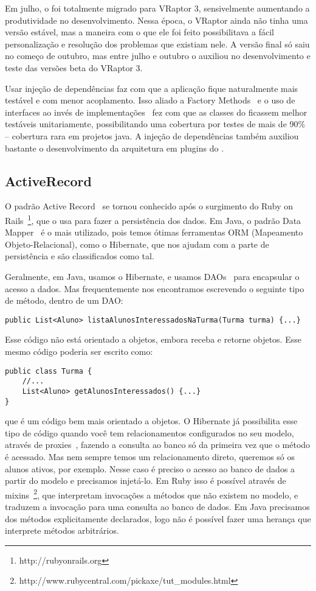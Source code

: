 Em julho, o \calopsita foi totalmente migrado para VRaptor 3, sensivelmente aumentando a produtividade no desenvolvimento. Nessa época, o VRaptor ainda não tinha uma versão estável, mas a maneira com o que ele foi feito possibilitava a fácil personalização e resolução dos problemas que existiam nele. A versão final só saiu no começo de outubro, mas entre julho e outubro o \calopsita auxiliou no desenvolvimento e teste das versões beta do VRaptor 3.

Usar injeção de dependências faz com que a aplicação fique naturalmente mais testável e com menor acoplamento. Isso aliado a Factory Methods~\cite{gof} e o uso de interfaces ao invés de implementações~\cite{effective} fez com que as classes do \calopsita ficassem melhor testáveis unitariamente, possibilitando uma cobertura por testes de mais de 90\% -- cobertura rara em projetos java. A injeção de dependências também auxiliou bastante o desenvolvimento da arquitetura em plugins do \calopsita.

\subsection{ActiveRecord}

O padrão Active Record~\cite{fowler} se tornou conhecido após o surgimento do Ruby on Rails~\footnote{http://rubyonrails.org}, que o usa para fazer a persistência dos dados. Em Java, o padrão Data Mapper~\cite{fowler} é o mais utilizado, pois temos ótimas ferramentas ORM (Mapeamento Objeto-Relacional), como o Hibernate, que nos ajudam com a parte de persistência e são classificados como tal.

Geralmente, em Java, usamos o Hibernate, e usamos DAOs~\cite{dao} para encapsular o acesso a dados. Mas frequentemente nos encontramos escrevendo o seguinte tipo de método, dentro de um DAO:

\begin{lstlisting}
public List<Aluno> listaAlunosInteressadosNaTurma(Turma turma) {...}
\end{lstlisting}

Esse código não está orientado a objetos, embora receba e retorne objetos. Esse mesmo código poderia ser escrito como:

\begin{lstlisting}
public class Turma {
	//...
	List<Aluno> getAlunosInteressados() {...}
}
\end{lstlisting}

que é um código bem mais orientado a objetos. O Hibernate já possibilita esse tipo de código quando você tem relacionamentos configurados no seu modelo, através de proxies~\cite{gof}, fazendo a consulta ao banco só da primeira vez que o método é acessado. Mas nem sempre temos um relacionamento direto, queremos só os alunos ativos, por exemplo. Nesse caso é preciso o acesso ao banco de dados a partir do modelo e precisamos injetá-lo. Em Ruby isso é possível através de mixins~\footnote{http://www.rubycentral.com/pickaxe/tut\_modules.html}, que interpretam invocações a métodos que não existem no modelo, e traduzem a invocação para uma consulta ao banco de dados. Em Java precisamos dos métodos explicitamente declarados, logo não é possível fazer uma herança que interprete métodos arbitrários.

